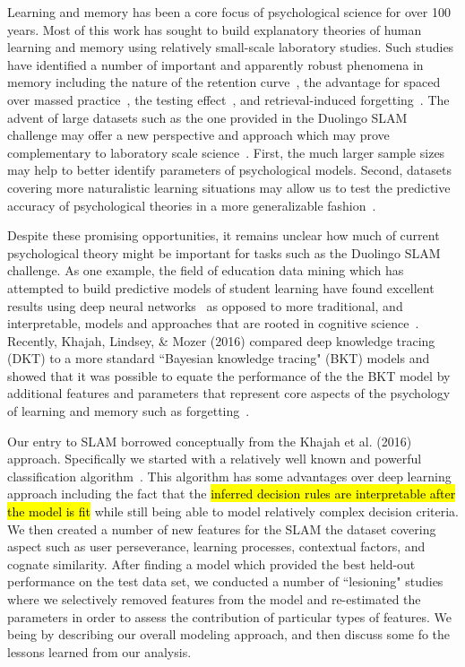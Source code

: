 \documentclass[11pt,a4paper]{article}
\begin{document}
Learning and memory has been a core focus of psychological science for
over 100 years. Most of this work has sought to build explanatory theories of human learning
and memory using relatively small-scale laboratory studies.  Such studies have
identified a number of important and apparently robust phenomena in memory including
the nature of the retention curve~\cite{Rubin:1996aa}, the advantage for spaced over massed 
practice~\cite{Ruth:1928aa,Cepeda:2006aa,Mozer:2009cs}, the testing effect~\cite{Roediger2006te},
and retrieval-induced forgetting~\cite{Anderson1994rif}.
The advent of large datasets such as the one provided in the Duolingo SLAM challenge
may offer a new perspective and approach which may prove complementary
to laboratory scale science~\cite{Griffiths:2015aa,Goldstone:2016aa}.  First, the much
larger sample sizes may help to better identify parameters of psychological models.
Second, datasets covering more naturalistic learning situations may allow us to test 
the predictive accuracy of psychological theories in a more generalizable fashion~\cite{Yarkoni:2017aa}.

Despite these promising opportunities, it remains unclear how much of current psychological
theory might be important for tasks such as the Duolingo SLAM challenge.
As one example, the field of education data mining which has attempted to build
predictive models of student learning have found excellent results using
deep neural networks~\cite[so called ``deep knowledge tracing",][]{Piech:2015aa} 
as opposed to more traditional, and interpretable, models and approaches
that are rooted in cognitive science~\cite[e.g.,][]{Atkinson:1972rm,Atkinson:1972rz,Corbett1995bkt,Pavlik:2008rm,Tubridy:2018ab}. 
Recently, Khajah, Lindsey, \& Mozer (2016) compared deep knowledge tracing (DKT) to a more
standard ``Bayesian knowledge tracing" (BKT) models and showed
that it was possible to equate the performance of the the BKT model by additional 
features and parameters that represent core aspects of the psychology of learning
and memory such as forgetting~\cite{Khajah2016hdnt}.

Our entry to SLAM borrowed conceptually from the Khajah et al. (2016) approach.
Specifically we started with a relatively well known and powerful classification algorithm~\cite[gradient
boosting decision trees, GBDT,][]{ke2017lightgbm}.  This algorithm has some advantages
over deep learning approach including the fact that the \hl{inferred decision rules are
interpretable after the model is fit} while still being able to model relatively complex
decision criteria.  We then created a number of new features for the SLAM
the dataset covering aspect such as user perseverance, learning processes, 
contextual factors, and cognate similarity.  After finding a model which provided the best
held-out performance on the test data set, we conducted a number of ``lesioning" studies where
we selectively removed features from the model and re-estimated the parameters in order
to assess the contribution of particular types of features.  We being by describing our 
overall modeling approach, and then discuss some fo the lessons learned from our analysis.
\end{document}

